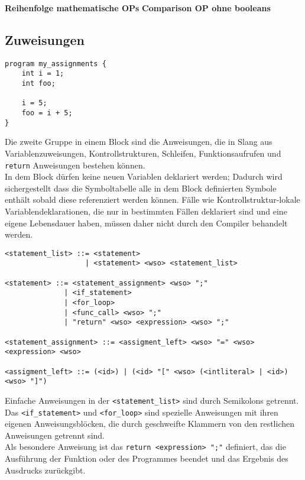 \textbf{Reihenfolge mathematische OPs}
\textbf{Comparison OP ohne booleans}\\

\subsection{Zuweisungen}

\begin{lstlisting}
program my_assignments {
    int i = 1;
    int foo;

    i = 5;
    foo = i + 5;
}
\end{lstlisting}

Die zweite Gruppe in einem Block sind die Anweisungen, die in Slang aus Variablenzuweisungen, Kontrollstrukturen, Schleifen, Funktionsaufrufen und \texttt{return} Anweisungen bestehen können.\\

In dem Block dürfen keine neuen Variablen deklariert werden; Dadurch wird sichergestellt dass die Symboltabelle alle in dem Block definierten Symbole enthält sobald diese referenziert werden können.
Fälle wie Kontrollstruktur-lokale Variablendeklarationen, die nur in bestimmten Fällen deklariert sind und eine eigene Lebensdauer haben, müssen
daher nicht durch den Compiler behandelt werden.\\

\begin{lstlisting}
<statement_list> ::= <statement>
                   | <statement> <wso> <statement_list>

<statement> ::= <statement_assignment> <wso> ";"
              | <if_statement>
              | <for_loop>
              | <func_call> <wso> ";"
              | "return" <wso> <expression> <wso> ";"

<statement_assignment> ::= <assigment_left> <wso> "=" <wso> <expression> <wso>

<assigment_left> ::= (<id>) | (<id> "[" <wso> (<intliteral> | <id>) <wso> "]")
\end{lstlisting}

Einfache Anweisungen in der \texttt{<statement\_list>} sind durch Semikolons getrennt.
Das \texttt{<if\_statement>} und \texttt{<for\_loop>} sind spezielle Anweisungen mit ihren eigenen Anweisungsblöcken, die durch geschweifte Klammern von den restlichen Anweisungen getrennt sind.\\
Als besondere Anweisung ist das \texttt{return <expression> ";"} definiert, das die Ausführung der Funktion oder des Programmes beendet und das Ergebnis des Ausdrucks zurückgibt.\\

